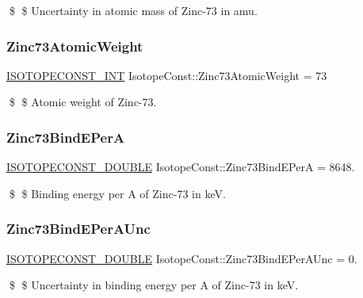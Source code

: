 \$ \$ Uncertainty in atomic mass of Zinc-\/73 in amu. \mbox{\label{group___isotope_const-_zinc-_zn73_ga3930cb7a77d77183984bbaf35e021967}} 
\subsubsection{\texorpdfstring{Zinc73\+Atomic\+Weight}{Zinc73AtomicWeight}}
{\footnotesize\ttfamily \mbox{\hyperlink{group___isotope_const-_macros_ga5f18360b3e99483a35c32d789e62621c}{I\+S\+O\+T\+O\+P\+E\+C\+O\+N\+S\+T\+\_\+\+I\+NT}} Isotope\+Const\+::\+Zinc73\+Atomic\+Weight = 73}

\$ \$ Atomic weight of Zinc-\/73. \mbox{\label{group___isotope_const-_zinc-_zn73_ga625dca42f772263807ff940e43ab5f51}} 
\subsubsection{\texorpdfstring{Zinc73\+Bind\+E\+PerA}{Zinc73BindEPerA}}
{\footnotesize\ttfamily \mbox{\hyperlink{group___isotope_const-_macros_ga8f45a7272ce02c0b4c65c44636ed719a}{I\+S\+O\+T\+O\+P\+E\+C\+O\+N\+S\+T\+\_\+\+D\+O\+U\+B\+LE}} Isotope\+Const\+::\+Zinc73\+Bind\+E\+PerA = 8648.}

\$ \$ Binding energy per A of Zinc-\/73 in keV. \mbox{\label{group___isotope_const-_zinc-_zn73_ga5de0623071c074001f0fa78fe17a3877}} 
\subsubsection{\texorpdfstring{Zinc73\+Bind\+E\+Per\+A\+Unc}{Zinc73BindEPerAUnc}}
{\footnotesize\ttfamily \mbox{\hyperlink{group___isotope_const-_macros_ga8f45a7272ce02c0b4c65c44636ed719a}{I\+S\+O\+T\+O\+P\+E\+C\+O\+N\+S\+T\+\_\+\+D\+O\+U\+B\+LE}} Isotope\+Const\+::\+Zinc73\+Bind\+E\+Per\+A\+Unc = 0.}

\$ \$ Uncertainty in binding energy per A of Zinc-\/73 in keV. \mbox{\label{group___isotope_const-_zinc-_zn73_ga88e513bb5403c2ff74b7962804520400}} 

